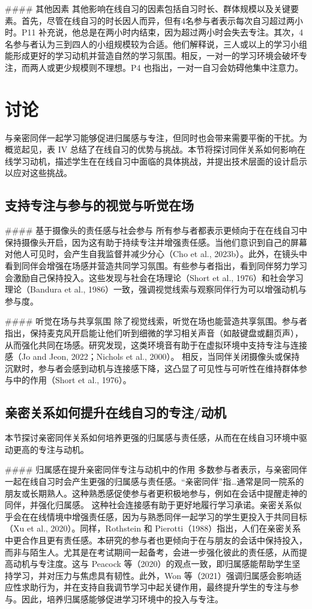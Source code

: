 \documentclass[12pt]{ctexart}
\begin{document}
\#\#\#\# 其他因素
其他影响在线自习的因素包括自习时长、群体规模以及关键要素。首先，尽管在线自习的时长因人而异，但有4名参与者表示每次自习超过两小时。P11 补充说，他总是在两小时内结束，因为超过两小时会失去专注。其次，4名参与者认为三到四人的小组规模较为合适。他们解释说，三人或以上的学习小组能形成更好的学习动机并营造自然的学习氛围。相反，一对一的学习环境会破坏专注，而两人或更少规模则不理想。P4 也指出，一对一自习会妨碍他集中注意力。

\section{讨论}
与亲密同伴一起学习能够促进归属感与专注，但同时也会带来需要平衡的干扰。为概览起见，表 IV 总结了在线自习的优势与挑战。本节将探讨同伴关系如何影响在线学习动机，描述学生在在线自习中面临的具体挑战，并提出技术层面的设计启示以应对这些挑战。

\subsection{支持专注与参与的视觉与听觉在场}
\#\#\#\# 基于摄像头的责任感与社会参与
所有参与者都表示更倾向于在在线自习中保持摄像头开启，因为这有助于持续专注并增强责任感。当他们意识到自己的屏幕对他人可见时，会产生自我监督并减少分心（Cho et al., 2023b）。此外，在镜头中看到同伴会增强在场感并营造共同学习氛围。有些参与者指出，看到同伴努力学习会激励自己保持投入。这些发现与社会在场理论（Short et al., 1976）和社会学习理论（Bandura et al., 1986）一致，强调视觉线索与观察同伴行为可以增强动机与参与度。

\#\#\#\# 听觉在场与共享氛围
除了视觉线索，听觉在场也能营造共享氛围。参与者指出，保持麦克风开启能让他们听到细微的学习相关声音（如敲键盘或翻页声），从而强化共同在场感。研究发现，这类环境音有助于在虚拟环境中支持专注与连接感（Jo and Jeon, 2022；Nichols et al., 2000）。
相反，当同伴关闭摄像头或保持沉默时，参与者会感到动机与连接感下降，这凸显了可见性与可听性在维持群体参与中的作用（Short et al., 1976）。

\subsection{亲密关系如何提升在线自习的专注/动机}
本节探讨亲密同伴关系如何培养更强的归属感与责任感，从而在在线自习环境中驱动更高的专注与动机。

\#\#\#\# 归属感在提升亲密同伴专注与动机中的作用
多数参与者表示，与亲密同伴一起在线自习时会产生更强的归属感与责任感。“亲密同伴”指…通常是同一院系的朋友或长期熟人。这种熟悉感促使参与者更积极地参与，例如在会话中提醒走神的同伴，并强化归属感。
这种社会连接感有助于更好地履行学习承诺。亲密关系似乎会在在线情境中增强责任感，因为与熟悉同伴一起学习的学生更投入于共同目标（Xu et al., 2020）。同样，Rothstein 和 Pierotti（1988）指出，人们在亲密关系中更合作且更有责任感。本研究的参与者也更倾向于在与朋友的会话中保持投入，而非与陌生人。尤其是在考试期间一起备考，会进一步强化彼此的责任感，从而提高动机与专注度。这与 Peacock 等（2020）的观点一致，即归属感能帮助学生坚持学习，并对压力与焦虑具有韧性。此外，Won 等（2021）强调归属感会影响适应性求助行为，并在支持自我调节学习中起关键作用，最终提升学生的专注与参与。因此，培养归属感能够促进学习环境中的投入与专注。
\end{document}
